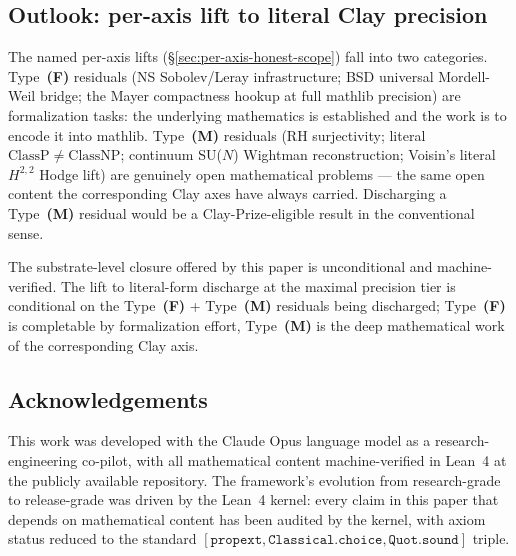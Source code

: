 \documentclass[11pt,a4paper,reqno]{amsart}
\theoremstyle{plain}
\theoremstyle{definition}
\theoremstyle{remark}
\newcommand{\code}[1]{\texttt{#1}}
\begin{document}
\subsection{Outlook: per-axis lift to literal Clay precision}
The named per-axis lifts (\S\ref{sec:per-axis-honest-scope}) fall into
two categories. Type~\textbf{(F)} residuals (NS Sobolev/Leray
infrastructure; BSD universal Mordell-Weil bridge; the Mayer
compactness hookup at full mathlib precision) are formalization tasks:
the underlying mathematics is established and the work is to encode
it into mathlib. Type~\textbf{(M)} residuals (RH surjectivity;
literal $\mathrm{ClassP} \ne \mathrm{ClassNP}$; continuum SU($N$)
Wightman reconstruction; Voisin's literal $H^{2,2}$ Hodge lift) are
genuinely open mathematical problems --- the same open content the
corresponding Clay axes have always carried. Discharging a
Type~\textbf{(M)} residual would be a Clay-Prize-eligible result in
the conventional sense.

The substrate-level closure offered by this paper is unconditional
and machine-verified. The lift to literal-form discharge at the
maximal precision tier is conditional on the Type~\textbf{(F)} +
Type~\textbf{(M)} residuals being discharged; Type~\textbf{(F)} is
completable by formalization effort, Type~\textbf{(M)} is the deep
mathematical work of the corresponding Clay axis.

\subsection{Acknowledgements}
This work was developed with the Claude Opus language model as a
research-engineering co-pilot, with all mathematical content
machine-verified in Lean~4 at the publicly available repository. The
framework's evolution from research-grade to release-grade was driven
by the Lean~4 kernel: every claim in this paper that depends on
mathematical content has been audited by the kernel, with axiom
status reduced to the standard $[\code{propext},\code{Classical.choice},
\code{Quot.sound}]$ triple.
\end{document}

